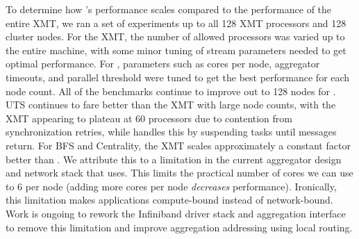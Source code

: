 {%
%
%
To determine how \Grappa's performance scales compared to the performance of the entire XMT, we ran a set of experiments up to all 128 XMT processors and 128 cluster nodes. For the XMT, the number of allowed processors was varied up to the entire machine, with some minor tuning of stream parameters needed to get optimal performance. For \Grappa, parameters such as cores per node, aggregator timeouts, and parallel threshold were tuned to get the best performance for each node count. All of the benchmarks continue to improve out to 128 nodes for \Grappa. UTS continues to fare better than the XMT with large node counts, with the XMT appearing to plateau at 60 processors due to contention from synchronization retries, while \Grappa handles this by suspending tasks until messages return. For BFS and Centrality, the XMT scales approximately a constant factor better than \Grappa. We attribute this to a limitation in the current aggregator design and network stack that \Grappa uses.  This limits the practical number of cores we can use to 6 per node (adding more cores per node \emph{decreases\/} performance).  Ironically, this limitation makes \Grappa applications compute-bound instead of network-bound.  Work is ongoing to rework the Infiniband driver stack and aggregation interface to remove this limitation and improve aggregation addressing using local routing.

}
